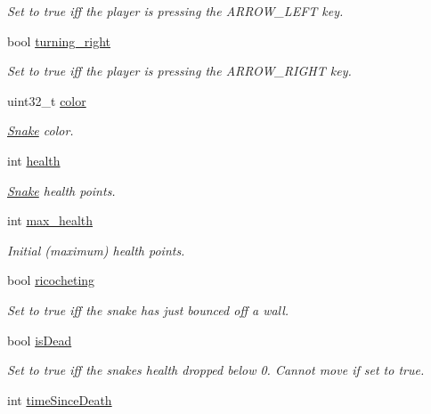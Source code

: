\begin{DoxyCompactItemize}
\begin{DoxyCompactList}\small\item\em Set to true iff the player is pressing the A\+R\+R\+O\+W\+\_\+\+L\+E\+FT key. \end{DoxyCompactList}\item 
bool \mbox{\hyperlink{group__snake_ga3c8626bc3f65ba80fb852c3cfeaf356c}{turning\+\_\+right}}
\begin{DoxyCompactList}\small\item\em Set to true iff the player is pressing the A\+R\+R\+O\+W\+\_\+\+R\+I\+G\+HT key. \end{DoxyCompactList}\item 
uint32\+\_\+t \mbox{\hyperlink{group__snake_gaeaaf26de3f02db45a8bab738d4b2ca64}{color}}
\begin{DoxyCompactList}\small\item\em \mbox{\hyperlink{struct_snake}{Snake}} color. \end{DoxyCompactList}\item 
int \mbox{\hyperlink{group__snake_ga9579d3c93826054b42af664d0a4919d6}{health}}
\begin{DoxyCompactList}\small\item\em \mbox{\hyperlink{struct_snake}{Snake}} health points. \end{DoxyCompactList}\item 
int \mbox{\hyperlink{group__snake_ga1150d62946b0817287c3a23597993d08}{max\+\_\+health}}
\begin{DoxyCompactList}\small\item\em Initial (maximum) health points. \end{DoxyCompactList}\item 
bool \mbox{\hyperlink{group__snake_ga7fa12626da8070f765499c9dae661271}{ricocheting}}
\begin{DoxyCompactList}\small\item\em Set to true iff the snake has just bounced off a wall. \end{DoxyCompactList}\item 
bool \mbox{\hyperlink{group__snake_ga781e80a4c24c09fbe284d49097e6c334}{is\+Dead}}
\begin{DoxyCompactList}\small\item\em Set to true iff the snake\textquotesingle{}s health dropped below 0. Cannot move if set to true. \end{DoxyCompactList}\item 
int \mbox{\hyperlink{group__snake_gad5771c4485a61c0bbbc101ce0b1fe81f}{time\+Since\+Death}}

\end{DoxyCompactItemize}
